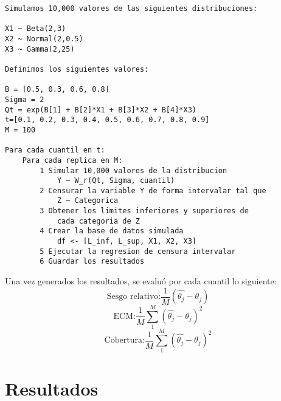 \begin{lstlisting}
Simulamos 10,000 valores de las siguientes distribuciones:

X1 ~ Beta(2,3) 
X2 ~ Normal(2,0.5)
X3 ~ Gamma(2,25)

Definimos los siguientes valores:

B = [0.5, 0.3, 0.6, 0.8] 
Sigma = 2
Qt = exp(B[1] + B[2]*X1 + B[3]*X2 + B[4]*X3)
t=[0.1, 0.2, 0.3, 0.4, 0.5, 0.6, 0.7, 0.8, 0.9]
M = 100

Para cada cuantil en t:
	Para cada replica en M:
		1 Simular 10,000 valores de la distribucion 
			Y ~ W_r(Qt, Sigma, cuantil)
		2 Censurar la variable Y de forma intervalar tal que
			Z ~ Categorica
		3 Obtener los limites inferiores y superiores de
			cada categoria de Z
		4 Crear la base de datos simulada
			df <- [L_inf, L_sup, X1, X2, X3]
		5 Ejecutar la regresion de censura intervalar
		6 Guardar los resultados
\end{lstlisting}


Una vez generados los resultados, se evaluó por cada cuantil lo siguiente:
\[ \text{Sesgo relativo:} \frac{1}{M}(\hat{\theta_j} - \theta_j)\]
\[ \text{ECM:} \frac{1}{M} \sum_1^M (\hat{\theta_j} - \theta_j)^2 \]
\[ \text{Cobertura:} \frac{1}{M} \sum_1^M (\hat{\theta_j} - \theta_j)^2 \]

\section{Resultados}

